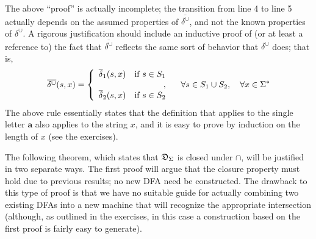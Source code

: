
The above ``proof'' is actually incomplete; the transition from line 4 to line 5
actually depends on the assumed properties of $\overline{\delta^\cup}$, and not the known
properties of $\delta^\cup$. A rigorous justification should include an
inductive proof of (or at least a reference to) the fact that $\overline{\delta^\cup}$
reflects the same sort of behavior that $\delta^\cup$ does; that is,
\[ \overline{\delta^\cup}(s,x) = \left\{\begin{array}{lr}
				\overline{\delta}_1(s,x) & \text{if }s \in S_1 \\
				& , \\
				\overline{\delta}_2(s,x) & \text{if }s \in S_2
			     \end{array}\right.
\quad \forall s \in S_1 \cup S_2,\quad \forall x \in \Sigma^* \]
The above rule essentially states that the definition that applies to the single
letter $\pmb{a}$ also applies to the string $x$, and it is easy to prove by
induction on the length of $x$ (see the exercises).

The following theorem, which states that $\mathfrak{D}_\Sigma$ is closed under
$\cap$, will be justified in two separate ways. The first proof will argue that
the closure property must hold due to previous results; no new DFA need be
constructed. The drawback to this type of proof is that we have no suitable
guide for actually combining two existing DFAs into a new machine that will
recognize the appropriate intersection (although, as outlined in the exercises,
in this case a construction based on the first proof is fairly easy to generate).

